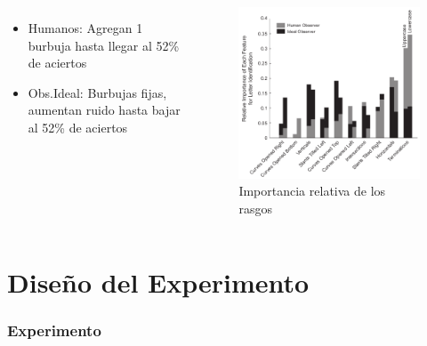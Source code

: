 \documentclass[10pt]{beamer}
\begin{document}
\begin{frame}
\begin{columns}[t]
{	    
	    \begin{itemize}
		\item Humanos: Agregan 1 burbuja hasta llegar al 52\% de aciertos
		\item Obs.Ideal: Burbujas fijas, aumentan ruido hasta bajar al 52\% de aciertos
	    \end{itemize}	    
	    \begin{figure}
		\includegraphics[width=0.5\textheight]{graficos/fiset5.png}
		\caption{Importancia relativa de los rasgos}
	    \end{figure}
	  }
	\end{columns}
      \end{frame}

\part[Experimento]{Diseño del Experimento}
\frame{\partpage}
\section{Experimento}
\end{document}
